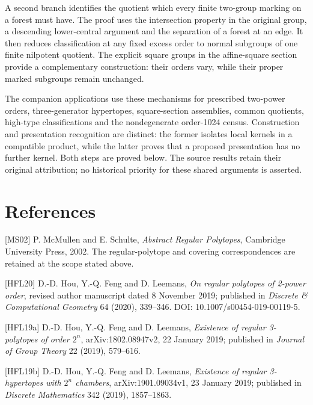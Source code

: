 A second branch identifies the quotient which every finite two-group
marking on a forest must have. The proof uses the intersection property
in the original group, a descending lower-central argument and the
separation of a forest at an edge. It then reduces classification at any
fixed excess order to normal subgroups of one finite nilpotent quotient.
The explicit square groups in the affine-square section provide a complementary
construction: their orders vary, while their proper marked subgroups
remain unchanged.

The companion applications use these mechanisms for prescribed two-power
orders, three-generator hypertopes, square-section assemblies, common
quotients, high-type classifications and the nondegenerate order-1024 census.
Construction and presentation recognition are distinct: the former isolates
local kernels in a compatible product, while the latter proves that a proposed
presentation has no further kernel. Both steps are proved below. The source
results retain their original attribution; no historical priority for these
shared arguments is asserted.











\section*{References}
{[}MS02{]} P. McMullen and E. Schulte, \emph{Abstract Regular
Polytopes}, Cambridge University Press, 2002. The regular-polytope and
covering correspondences are retained at the scope stated above.

{[}HFL20{]} D.-D. Hou, Y.-Q. Feng and D. Leemans, \emph{On regular
polytopes of 2-power order}, revised author manuscript dated 8 November
2019; published in \emph{Discrete \& Computational Geometry} 64 (2020),
339--346. DOI: 10.1007/s00454-019-00119-5.

{[}HFL19a{]} D.-D. Hou, Y.-Q. Feng and D. Leemans, \emph{Existence of
regular 3-polytopes of order \(2^n\)}, arXiv:1802.08947v2, 22 January
2019; published in \emph{Journal of Group Theory} 22 (2019), 579--616.

{[}HFL19b{]} D.-D. Hou, Y.-Q. Feng and D. Leemans, \emph{Existence of
regular 3-hypertopes with \(2^n\) chambers}, arXiv:1901.09034v1, 23
January 2019; published in \emph{Discrete Mathematics} 342 (2019),
1857--1863.

